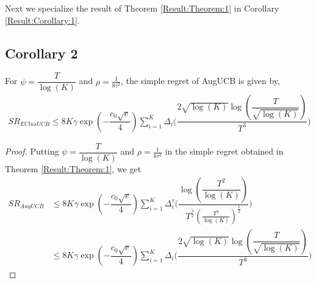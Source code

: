	Next we specialize the result of Theorem \ref{Result:Theorem:1} in Corollary \ref{Result:Corollary:1}.

\subsection{Corollary 2}


\begin{corollary}
\label{Result:Corollary:1}
For $\psi=\dfrac{T}{\log (K)}$ and $\rho=\frac{1}{8\tau^{2}}$, the simple regret of AugUCB is given by,
\begin{align*}
SR_{EClusUCB} \leq  8K \gamma \exp(-\dfrac{c_{0}\sqrt{e}}{4}) \sum_{i=1}^{K} \Delta_{i}  \bigg(\dfrac{2 \sqrt{\log (K)} \log (\dfrac{T}{\sqrt{\log (K)}} )}{T^{3}}\bigg)
\end{align*}
\end{corollary}

\begin{proof}
Putting $\psi=\dfrac{T}{\log (K)}$ and $\rho=\frac{1}{8\tau^{2}}$ in the simple regret obtained in Theorem \ref{Result:Theorem:1}, we get
\begin{align*}
SR_{AugUCB} &\leq 8K \gamma \exp(-\dfrac{c_{0}\sqrt{e}}{4}) \sum_{i=1}^{K} \Delta_{i}^{\tau}  \bigg(\dfrac{\log (\dfrac{T^{2}}{\log (K)} )}{T^{\frac{3}{2}}(\frac{T^3}{\log (K)})^{\frac{1}{2}}}\bigg)\\
& \leq 8K \gamma \exp(-\dfrac{c_{0}\sqrt{e}}{4}) \sum_{i=1}^{K} \Delta_{i}  \bigg(\dfrac{2 \sqrt{\log (K)} \log (\dfrac{T}{\sqrt{\log (K)}} )}{T^{3}}\bigg)
\end{align*} 

\end{proof}